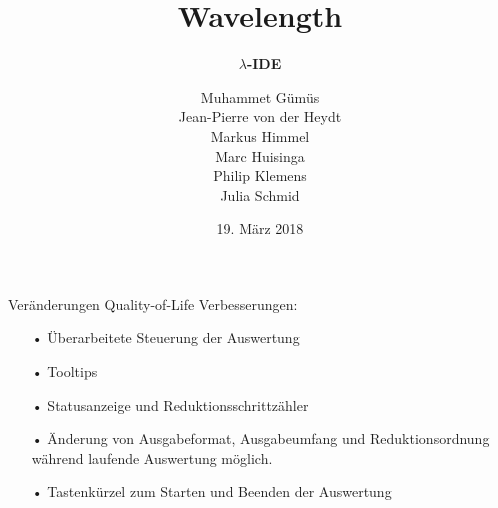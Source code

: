 \documentclass[10pt]{beamer}
\title[] %
{ %
      \textbf{Wavelength}
}
\subtitle[$\lambda$-IDE]
{
      \textbf{$\lambda$-IDE}
}
\author[wavelength]
{     
      Muhammet Gümüs \\
      Jean-Pierre von der Heydt \\  
       Markus Himmel \\
       Marc Huisinga \\
       Philip Klemens \\ 
       Julia Schmid   }
\institute[]
{
      
  
}
\date{19. März 2018}
\begin{document}

{
\begin{frame}[plain]
\maketitle
\end{frame}
}

\begin{frame}{Veränderungen}
Quality-of-Life Verbesserungen:
\begin{itemize}
	\item[•] Überarbeitete Steuerung der Auswertung
	\item[•] Tooltips
	\item[•] Statusanzeige und Reduktionsschrittzähler
	\item[•] Änderung von Ausgabeformat, Ausgabeumfang und Reduktionsordnung während laufende Auswertung möglich.
	\item[•] Tastenkürzel zum Starten und Beenden der Auswertung
\end{itemize}
\end{frame}
\end{document}
